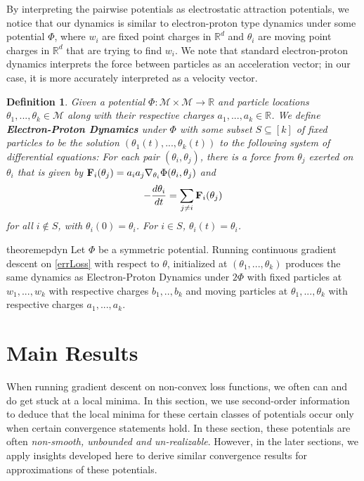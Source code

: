 \documentclass{article}
\newtheorem{definition}[theorem]{Definition}
\newcommand{\R}{{\mathbb{R}}}
\begin{document}
By interpreting the pairwise potentials as electrostatic attraction
potentials, we notice that our dynamics is similar to electron-proton
type dynamics under some potential $\Phi$, where $w_i$ are fixed point
charges in $\R^d$ and $\theta_i$ are moving point charges in $\R^d$
that are trying to find $w_i$. We note that standard electron-proton dynamics interprets the force between particles as an acceleration vector; in our case, it is more accurately interpreted as a velocity vector. 
%
\begin{definition}\label{EPDef}
  Given a potential $\Phi : \mathcal{M} \times \mathcal{M} \to \R$ and
  particle locations $\theta_1,...,\theta_k \in \mathcal{M}$ along
  with their respective charges $a_1,...,a_k \in \R$. We define {\bf
    Electron-Proton Dynamics} under $\Phi$ with some subset $S \subseteq [k]$ of fixed particles to be the solution $(\theta_1(t),...,\theta_k(t))$ to the following system of
  differential equations: For each pair $(\theta_i,\theta_j)$, there
  is a force from $\theta_j$ exerted on $\theta_i$ that is given by
  ${\bf F}_{i}(\theta_j) = a_ia_j\nabla_{\theta_i}
  \Phi(\theta_i,\theta_j)$ and
\[-\frac{d\theta_i}{dt} =  \sum_{ j \neq i} {\bf F}_{i}(\theta_j)\]
for all $i \not \in S$, with $\theta_i(0) = \theta_i$. For $i \in S$, $\theta_i(t) =  \theta_i$.
\end{definition}
%
\begin{restatable}{theorem}{epdyn}
\label{EPDyn}
Let $\Phi$ be a symmetric potential. Running continuous gradient descent on \eqref{errLoss} with respect to $\theta$, initialized at $(\theta_1,...,\theta_k)$ produces the same dynamics as Electron-Proton Dynamics under $2\Phi$ with fixed particles at $w_1,...,w_k$ with respective charges $b_1,..,b_k$ and moving particles at $\theta_1,...,\theta_k$ with respective charges $a_1,...,a_k$.
\end{restatable}
%
%
\section{Main Results} 
%
When running gradient descent on non-convex loss functions, we often
can and do get stuck at a local minima. In this section, we use
second-order information to deduce that the local
minima for these certain classes of potentials occur only when certain convergence statements hold. In these section, these potentials are often {\it non-smooth, unbounded and un-realizable}. However, in the later sections, we apply insights developed here to derive similar convergence results for approximations of these potentials.
%
\end{document}
